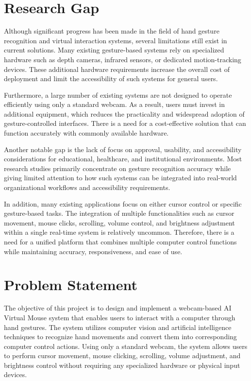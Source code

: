 \documentclass[12pt,a4paper]{report}
\begin{document}
\section{Research Gap}



Although significant progress has been made in the field of hand gesture recognition and virtual interaction systems, several limitations still exist in current solutions. Many existing gesture-based systems rely on specialized hardware such as depth cameras, infrared sensors, or dedicated motion-tracking devices. These additional hardware requirements increase the overall cost of deployment and limit the accessibility of such systems for general users.

Furthermore, a large number of existing systems are not designed to operate efficiently using only a standard webcam. As a result, users must invest in additional equipment, which reduces the practicality and widespread adoption of gesture-controlled interfaces. There is a need for a cost-effective solution that can function accurately with commonly available hardware.

Another notable gap is the lack of focus on approval, usability, and accessibility considerations for educational, healthcare, and institutional environments. Most research studies primarily concentrate on gesture recognition accuracy while giving limited attention to how such systems can be integrated into real-world organizational workflows and accessibility requirements.

In addition, many existing applications focus on either cursor control or specific gesture-based tasks. The integration of multiple functionalities such as cursor movement, mouse clicks, scrolling, volume control, and brightness adjustment within a single real-time system is relatively uncommon. Therefore, there is a need for a unified platform that combines multiple computer control functions while maintaining accuracy, responsiveness, and ease of use.

\section{Problem Statement}



The objective of this project is to design and implement a webcam-based AI Virtual Mouse system that enables users to interact with a computer through hand gestures. The system utilizes computer vision and artificial intelligence techniques to recognize hand movements and convert them into corresponding computer control actions. Using only a standard webcam, the system allows users to perform cursor movement, mouse clicking, scrolling, volume adjustment, and brightness control without requiring any specialized hardware or physical input devices.
\end{document}
